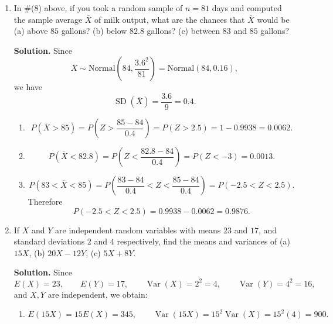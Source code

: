 \documentclass[12pt]{article}
\begin{document}
\begin{enumerate}[label=(\arabic*), leftmargin=*]
For the second part, we need the 20th percentile because
\[
P(X\ge x)=0.80 \quad \Longleftrightarrow \quad P(X\le x)=0.20.
\]
Using $z_{0.20}\approx -0.84$,
\[
\frac{x-84}{3.6}=-0.84,
\]
so
\[
x=84-0.84(3.6)=80.976.
\]
Thus on 80\% of days, the output is at least about
\[
80.976\text{ gallons}.
\]

\item In \#(8) above, if you took a random sample of $n=81$ days and computed the sample average $\overline{X}$ of milk output, what are the chances that $\overline{X}$ would be (a) above $85$ gallons? (b) below $82.8$ gallons? (c) between $83$ and $85$ gallons?

\par\medskip
\noindent\textbf{Solution.}
Since
\[
\overline{X}\sim \mathrm{Normal}\!\left(84,\frac{3.6^2}{81}\right)
=\mathrm{Normal}(84,0.16),
\]
we have
\[
\operatorname{SD}(\overline{X})=\frac{3.6}{9}=0.4.
\]

\begin{enumerate}[label=(\alph*), itemsep=0.5em]
    \item
    \[
    P(\overline{X}>85)
    =P\!\left(Z>\frac{85-84}{0.4}\right)
    =P(Z>2.5)=1-0.9938=0.0062.
    \]

    \item
    \[
    P(\overline{X}<82.8)
    =P\!\left(Z<\frac{82.8-84}{0.4}\right)
    =P(Z<-3)=0.0013.
    \]

    \item
    \[
    P(83<\overline{X}<85)
    =P\!\left(\frac{83-84}{0.4}<Z<\frac{85-84}{0.4}\right)
    =P(-2.5<Z<2.5).
    \]
    Therefore
    \[
    P(-2.5<Z<2.5)=0.9938-0.0062=0.9876.
    \]
\end{enumerate}

\item If $X$ and $Y$ are independent random variables with means $23$ and $17$, and standard deviations $2$ and $4$ respectively, find the means and variances of (a) $15X$, (b) $20X-12Y$, (c) $5X+8Y$.

\par\medskip
\noindent\textbf{Solution.}
Since
\[
E(X)=23,\qquad E(Y)=17,\qquad \operatorname{Var}(X)=2^2=4,\qquad \operatorname{Var}(Y)=4^2=16,
\]
and $X,Y$ are independent, we obtain:

\begin{enumerate}[label=(\alph*), itemsep=0.5em]
    \item
    \[
    E(15X)=15E(X)=345,
    \qquad
    \operatorname{Var}(15X)=15^2\operatorname{Var}(X)=15^2(4)=900.
    \]


\end{enumerate}
\end{enumerate}
\end{document}
